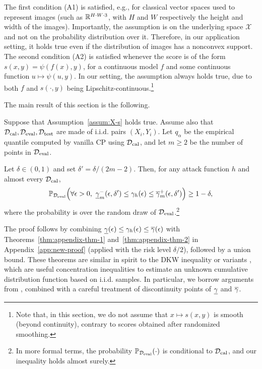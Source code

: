 The first condition (A1) is satisfied, e.g., for classical vector spaces used to represent images (such as $\mathbb{R}^{H \cdot W \cdot 3}$, with $H$ and $W$ respectively the height and width of the images). Importantly, the assumption is on the underlying space $\mathcal{X}$ and not on the probability distribution over it. Therefore, in our application setting, it holds true even if the distribution of images has a nonconvex support. The second condition (A2) is satisfied whenever the score is of the form $s(x,y)=\psi(f(x),y)$, for a continuous model $f$ and some continuous  function $u \mapsto \psi(u,y)$. In our setting, the assumption always holds true, due to both $f$ and $s(\cdot, y)$ being Lipschitz-continuous.\footnote{Note that, in this section, we do not assume that $x \mapsto s(x,y)$ is smooth (beyond continuity), contrary to scores obtained after randomized smoothing.}


The main result of this section is the following. 

\begin{theorem}
\label{thm:robustcoverageuniform}
Suppose that Assumption~\ref{assum:X-s} holds true. Assume also that $\mathcal{D}_\mathrm{cal}, \mathcal{D}_\mathrm{eval}, \mathcal{D}_\mathrm{test}$ are made of i.i.d. pairs $(X_i,Y_i)$. Let $q_\alpha$ be the empirical quantile computed by vanilla CP using $\mathcal{D}_\mathrm{cal}$, and let $m \geq 2$ be the number of points in $\mathcal{D}_\mathrm{eval}$.

Let $\delta \in (0,1)$ and set $\delta' = \delta/(2m - 2)$. Then, for any attack function $h$ and almost every $\mathcal{D}_\mathrm{cal}$,
\begin{equation}
	\Prhol{\forall \epsilon > 0, \ \covminmm(\epsilon,\delta') \leq \cov_h (\epsilon) \leq \covmaxmp(\epsilon,\delta')}\geq 1-\delta,
\end{equation}
where the probability is over the random draw of $\mathcal{D}_\mathrm{eval}$.\footnote{In more formal terms, the probability $\mathbb{P}_{\mathcal{D}_\mathrm{eval}}\!\left(\cdot\right)$ is conditional to $\mathcal{D}_\mathrm{cal}$, and our inequality holds almost surely.}
\end{theorem}

The proof follows by combining $\underline{\gamma}(\epsilon) \leq \gamma_h(\epsilon) \leq \overline{\gamma}(\epsilon)$ with Theorems~\ref{thm:appendix-thm-1} and~\ref{thm:appendix-thm-2} in Appendix~\ref{app:new-proof} (applied with the risk level $\delta/2$), followed by a union bound. These theorems are similar in spirit to the DKW inequality \citep{dvoretzky1956asymptotic,massart90tightConstantDKW} or variants \citep{vapnik1974theoryPatternRecognition,anthony1993resultVapnikapplications}, which are useful concentration inequalities to estimate an unknown cumulative distribution function based on i.i.d. samples. In particular, we borrow arguments from \citet[Theorem~1]{ducoffe2020high}, combined with a careful treatment of discontinuity points of $\underline{\gamma}$ and $\overline{\gamma}$.


